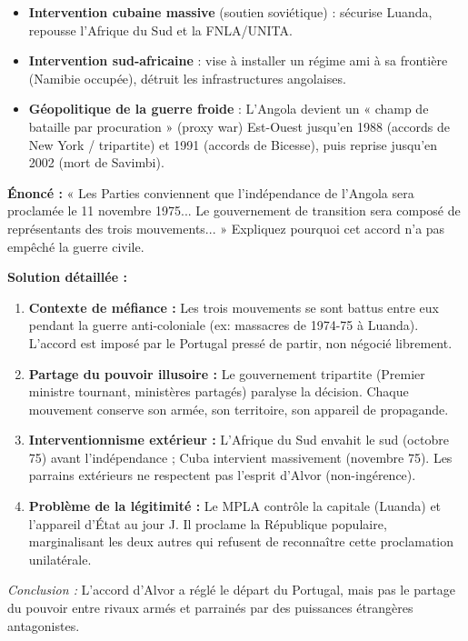 \documentclass[11pt]{article}
\begin{document}
\begin{itemize}
\item \textbf{Intervention cubaine massive} (soutien soviétique) : sécurise Luanda, repousse l'Afrique du Sud et la FNLA/UNITA.
\item \textbf{Intervention sud-africaine} : vise à installer un régime ami à sa frontière (Namibie occupée), détruit les infrastructures angolaises.
\item \textbf{Géopolitique de la guerre froide} : L'Angola devient un « champ de bataille par procuration » (proxy war) Est-Ouest jusqu'en 1988 (accords de New York / tripartite) et 1991 (accords de Bicesse), puis reprise jusqu'en 2002 (mort de Savimbi).
\end{itemize}

\begin{exoresolu}
\textbf{Énoncé :} « Les Parties conviennent que l'indépendance de l'Angola sera proclamée le 11 novembre 1975... Le gouvernement de transition sera composé de représentants des trois mouvements... » Expliquez pourquoi cet accord n'a pas empêché la guerre civile.

\tcblower
\textbf{Solution détaillée :}
\begin{enumerate}
\item \textbf{Contexte de méfiance :} Les trois mouvements se sont battus entre eux pendant la guerre anti-coloniale (ex: massacres de 1974-75 à Luanda). L'accord est imposé par le Portugal pressé de partir, non négocié librement.
\item \textbf{Partage du pouvoir illusoire :} Le gouvernement tripartite (Premier ministre tournant, ministères partagés) paralyse la décision. Chaque mouvement conserve son armée, son territoire, son appareil de propagande.
\item \textbf{Interventionnisme extérieur :} L'Afrique du Sud envahit le sud (octobre 75) avant l'indépendance ; Cuba intervient massivement (novembre 75). Les parrains extérieurs ne respectent pas l'esprit d'Alvor (non-ingérence).
\item \textbf{Problème de la légitimité :} Le MPLA contrôle la capitale (Luanda) et l'appareil d'État au jour J. Il proclame la République populaire, marginalisant les deux autres qui refusent de reconnaître cette proclamation unilatérale.
\end{enumerate}
\emph{Conclusion :} L'accord d'Alvor a réglé le départ du Portugal, mais pas le partage du pouvoir entre rivaux armés et parrainés par des puissances étrangères antagonistes.
\end{exoresolu}
\end{document}
